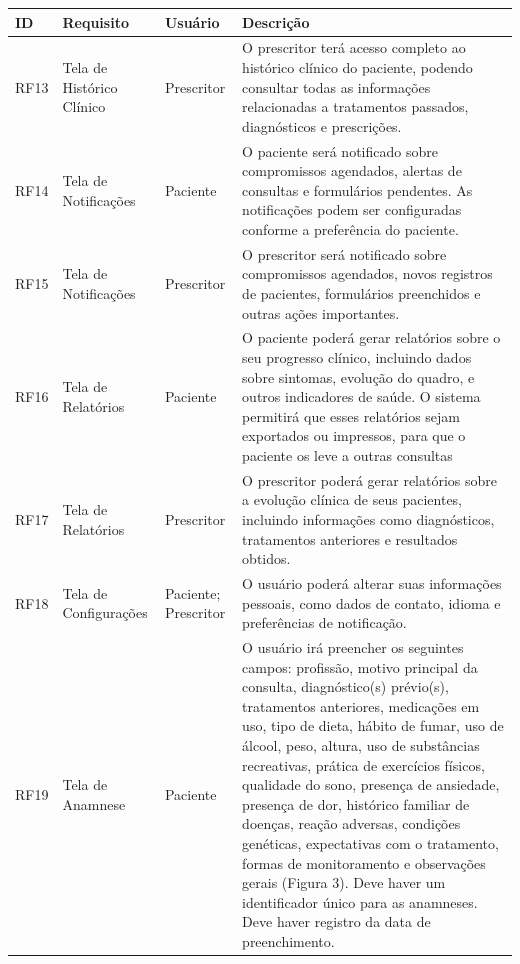 \href{}{}\documentclass[12pt,portuguese,oneside]{article}
\begin{document}
\begin{table}[H]
\centering
{}
\begin{tabularx}{\textwidth}{|>{\raggedright\arraybackslash}p{1cm}|>{\raggedright\arraybackslash}p{3cm}|>{\raggedright\arraybackslash}p{2cm}|>{\raggedright\arraybackslash}X|}
\hline
\rowcolor{gray!20}
\textbf{ID} & \textbf{Requisito} & \textbf{Usuário} & \textbf{Descrição}\\
\hline
RF13 & Tela de Histórico Clínico & Prescritor & O prescritor terá acesso completo ao histórico clínico do paciente, podendo consultar todas as informações relacionadas a tratamentos passados, diagnósticos e prescrições.\\
\hline
RF14 & Tela de Notificações & Paciente & O paciente será notificado sobre compromissos agendados, alertas de consultas e formulários pendentes. As notificações podem ser configuradas conforme a preferência do paciente.\\
\hline
RF15 & Tela de Notificações & Prescritor & O prescritor será notificado sobre compromissos agendados, novos registros de pacientes, formulários preenchidos e outras ações importantes.\\
\hline
RF16 & Tela de Relatórios & Paciente & O paciente poderá gerar relatórios sobre o seu progresso clínico, incluindo dados sobre sintomas, evolução do quadro, e outros indicadores de saúde. O sistema permitirá que esses relatórios sejam exportados ou impressos, para que o paciente os leve a outras consultas\\
\hline
RF17 & Tela de Relatórios & Prescritor & O prescritor poderá gerar relatórios sobre a evolução clínica de seus pacientes, incluindo informações como diagnósticos, tratamentos anteriores e resultados obtidos.\\
\hline
RF18 & Tela de Configurações & Paciente; Prescritor & O usuário poderá alterar suas informações pessoais, como dados de contato, idioma e preferências de notificação.\\
\hline
RF19 & Tela de Anamnese & Paciente & O usuário irá preencher os seguintes campos: profissão, motivo principal da consulta, diagnóstico(s) prévio(s), tratamentos anteriores, medicações em uso, tipo de dieta, hábito de fumar, uso de álcool, peso, altura, uso de substâncias recreativas, prática de exercícios físicos, qualidade do sono, presença de ansiedade, presença de dor, histórico familiar de doenças, reação adversas, condições genéticas, expectativas com o tratamento, formas de monitoramento e observações gerais (Figura 3). Deve haver um identificador único para as anamneses. Deve haver registro da data de preenchimento.\\
\hline
\end{tabularx}
\end{table}
\end{document}
